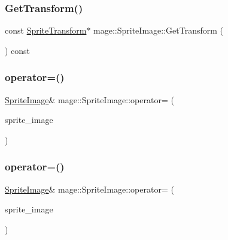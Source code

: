 \hypertarget{classmage_1_1_sprite_image_a3f49b42a7902421115601c2e5d73e795}{}\label{classmage_1_1_sprite_image_a3f49b42a7902421115601c2e5d73e795} 
\subsubsection{\texorpdfstring{Get\+Transform()}{GetTransform()}\hspace{0.1cm}{\footnotesize\ttfamily [2/2]}}
{\footnotesize\ttfamily const \hyperlink{structmage_1_1_sprite_transform}{Sprite\+Transform}$\ast$ mage\+::\+Sprite\+Image\+::\+Get\+Transform (\begin{DoxyParamCaption}{ }\end{DoxyParamCaption}) const}

\hypertarget{classmage_1_1_sprite_image_a11274f8f6c8653c13ed20d8684ccccd1}{}\label{classmage_1_1_sprite_image_a11274f8f6c8653c13ed20d8684ccccd1} 
\subsubsection{\texorpdfstring{operator=()}{operator=()}\hspace{0.1cm}{\footnotesize\ttfamily [1/2]}}
{\footnotesize\ttfamily \hyperlink{classmage_1_1_sprite_image}{Sprite\+Image}\& mage\+::\+Sprite\+Image\+::operator= (\begin{DoxyParamCaption}\item[{const \hyperlink{classmage_1_1_sprite_image}{Sprite\+Image} \&}]{sprite\+\_\+image }\end{DoxyParamCaption})\hspace{0.3cm}{\ttfamily [default]}}

\hypertarget{classmage_1_1_sprite_image_ac30edc4a29f41ad83f341a140335ddde}{}\label{classmage_1_1_sprite_image_ac30edc4a29f41ad83f341a140335ddde} 
\subsubsection{\texorpdfstring{operator=()}{operator=()}\hspace{0.1cm}{\footnotesize\ttfamily [2/2]}}
{\footnotesize\ttfamily \hyperlink{classmage_1_1_sprite_image}{Sprite\+Image}\& mage\+::\+Sprite\+Image\+::operator= (\begin{DoxyParamCaption}\item[{\hyperlink{classmage_1_1_sprite_image}{Sprite\+Image} \&\&}]{sprite\+\_\+image }\end{DoxyParamCaption})\hspace{0.3cm}{\ttfamily [default]}}

